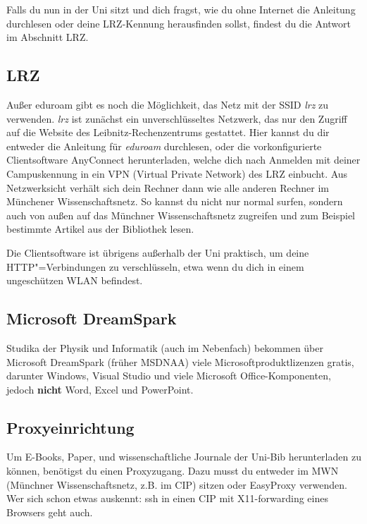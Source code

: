 Falls du nun in der Uni sitzt und dich fragst, wie du ohne Internet
die Anleitung durchlesen oder deine LRZ-Kennung herausfinden sollst, 
findest du die Antwort im Abschnitt LRZ.
\begin{urlList}
\end{urlList}

\subsection*{LRZ}
Außer eduroam gibt es noch die Möglichkeit, das Netz mit der SSID
\emph{lrz} zu verwenden. \emph{lrz} ist zunächst ein unverschlüsseltes
Netzwerk, das nur den Zugriff auf die Website des
Leibnitz-Rechenzentrums gestattet. Hier kannst du dir entweder die 
Anleitung für \emph{eduroam} durchlesen, oder die
vorkonfigurierte Clientsoftware AnyConnect herunterladen, welche dich
nach Anmelden mit deiner Campuskennung in ein VPN (Virtual Private
Network) des LRZ einbucht. Aus Netzwerksicht verhält sich dein Rechner
dann wie alle anderen Rechner im Münchener Wissenschaftsnetz. So
kannst du nicht nur normal surfen, sondern auch von außen auf das
Münchner Wissenschaftsnetz zugreifen und zum Beispiel bestimmte
Artikel aus der Bibliothek lesen.

Die Clientsoftware ist übrigens außerhalb der Uni praktisch, um deine
HTTP"=Verbindungen zu verschlüsseln, etwa wenn du dich in einem
ungeschützen WLAN befindest.

\subsection*{Microsoft DreamSpark \subjectList{\subjectI{}\subjectMI{}\subjectP{}}}
Studika der Physik und Informatik (auch im Nebenfach) bekommen über
Microsoft DreamSpark (früher MSDNAA) viele Microsoftproduktlizenzen
gratis, darunter Windows, Visual Studio und viele
Microsoft Office-Komponenten, jedoch \textbf{nicht} Word, Excel und PowerPoint.

\begin{urlList}
\end{urlList}

\subsection*{Proxyeinrichtung}
Um E-Books, Paper, und wissenschaftliche
Journale der Uni-Bib herunterladen zu können, benötigst du einen Proxyzugang.
Dazu musst du entweder im MWN (Münchner Wissenschaftsnetz, z.B. im CIP) sitzen
oder EasyProxy verwenden. Wer sich schon etwas auskennt: ssh in einen CIP mit X11-forwarding
eines Browsers geht auch.
\begin{urlList}
\end{urlList}
